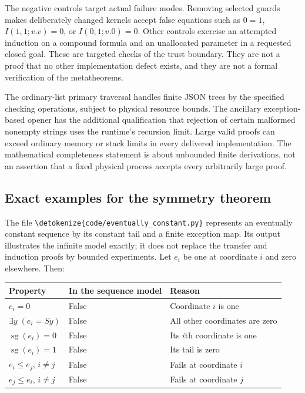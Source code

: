 \documentclass[11pt,letterpaper]{article}
\theoremstyle{definition}\newtheorem{definition}[theorem]{Definition}
\theoremstyle{remark}\newtheorem{remark}[theorem]{Remark}
\newcommand{\file}[1]{\expandafter\nolinkurl\expandafter{\detokenize{#1}}}
\begin{document}
The negative controls target actual failure modes. Removing selected
guards makes deliberately changed kernels accept false equations such
as $0=1$, $I(1,1;v.v)=0$, or $I(0,1;v.0)=0$. Other controls exercise
an attempted induction on a compound formula and an unallocated
parameter in a requested closed goal. These are targeted checks of the
trust boundary. They are not a proof that no other implementation defect
exists, and they are not a formal verification of the metatheorems.

The ordinary-list primary traversal handles finite JSON trees by the
specified checking operations, subject to physical resource bounds.
The ancillary exception-based opener has the additional qualification
that rejection of certain malformed nonempty strings uses the runtime's
recursion limit. Large valid proofs can exceed ordinary memory or stack
limits in every delivered implementation. The mathematical completeness
statement is about unbounded finite derivations, not an assertion that a
fixed physical process accepts every arbitrarily large proof.

\subsection{Exact examples for the symmetry theorem}

The file \file{code/eventually_constant.py} represents an eventually
constant sequence by its constant tail and a finite exception map.
Its output illustrates the infinite model exactly; it does not replace
the transfer and induction proofs by bounded experiments.
Let $e_i$ be one at coordinate $i$ and zero elsewhere. Then:
\begin{center}
\begin{tabular}{lll}
\toprule
Property & In the sequence model & Reason\\
\midrule
$e_i=0$ & False & Coordinate $i$ is one\\
$\exists y\;(e_i=Sy)$ & False & All other coordinates are zero\\
$\operatorname{sg}(e_i)=0$ & False & Its $i$th coordinate is one\\
$\operatorname{sg}(e_i)=1$ & False & Its tail is zero\\
$e_i\le e_j$, $i\ne j$ & False & Fails at coordinate $i$\\
$e_j\le e_i$, $i\ne j$ & False & Fails at coordinate $j$\\
\bottomrule
\end{tabular}
\end{center}
\end{document}
